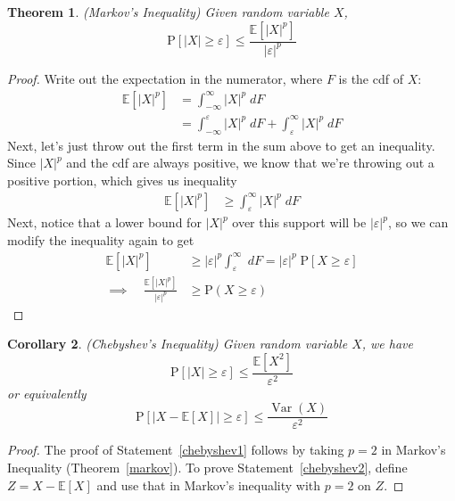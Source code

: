 \documentclass[12pt]{article}
\theoremstyle{plain}
\newtheorem{thm}{Theorem}[section]
\newtheorem{cor}[thm]{Corollary}
\theoremstyle{definition}
\theoremstyle{remark}
\newcommand{\Prb}{\mathrm{P}}
\newcommand{\E}{\mathbb{E}}
\newcommand{\Var}{\operatorname{Var}}
\begin{document}
\begin{thm}{\emph{(Markov's Inequality)}}
\label{thm:markov}
Given random variable $X$,
\begin{equation}
    \label{markov}
    \Prb\left[
      \left\lvert X\right\rvert
      \geq \varepsilon\right]
    \leq \frac{\E\left[|X|^p\right]}{|\varepsilon|^p}
\end{equation}
\end{thm}

\begin{proof}
Write out the expectation in the numerator, where $F$ is the cdf of $X$:
\begin{align*}
  \E\left[|X|^p\right]
  &= \int^\infty_{-\infty} |X|^p \; dF \\
  &= \int^{\varepsilon}_{-\infty} |X|^p \; dF
    + \int^\infty_{\varepsilon} |X|^p \; dF
\end{align*}
Next, let's just throw out the first term in the sum above to get an
inequality. Since $|X|^p$ and the cdf are always positive, we know that
we're throwing out a positive portion, which gives us inequality
\begin{align*}
  \E\left[|X|^p\right]
  &\geq \int^\infty_{\varepsilon} |X|^p \; dF
\end{align*}
Next, notice that a lower bound for $|X|^p$ over this support will be
$|\varepsilon|^p$, so we can modify the inequality again to get
\begin{align*}
  \E\left[|X|^p\right]
  &\geq  |\varepsilon|^p \int^\infty_{\varepsilon} \; dF
  = |\varepsilon|^p \; \Prb[X\geq \varepsilon] \\
  \implies \quad
  \frac{\E\left[|X|^p\right]}{|\varepsilon|^p}
  &\geq \Prb(X\geq \varepsilon)
\end{align*}
\end{proof}

\begin{cor}{\emph{(Chebyshev's Inequality)}}
Given random variable $X$, we have
\begin{equation}
  \label{chebyshev1}
  \Prb\left[
    \left\lvert X\right\rvert
    \geq \varepsilon\right]
  \leq \frac{\E\left[X^2\right]}{\varepsilon^2}
\end{equation}
or equivalently
\begin{equation}
  \label{chebyshev2}
  \Prb\left[
    \big\lvert X-\E[X]\big\rvert
    \geq \varepsilon\right]
  \leq \frac{\Var(X)}{\varepsilon^2}
\end{equation}
\end{cor}
\begin{proof}
The proof of Statement~\ref{chebyshev1} follows by taking $p=2$ in
Markov's Inequality (Theorem~\ref{markov}).
To prove Statement~\ref{chebyshev2}, define $Z=X-\E[X]$ and use that in
Markov's inequality with $p=2$ on $Z$.
\end{proof}
\end{document}
